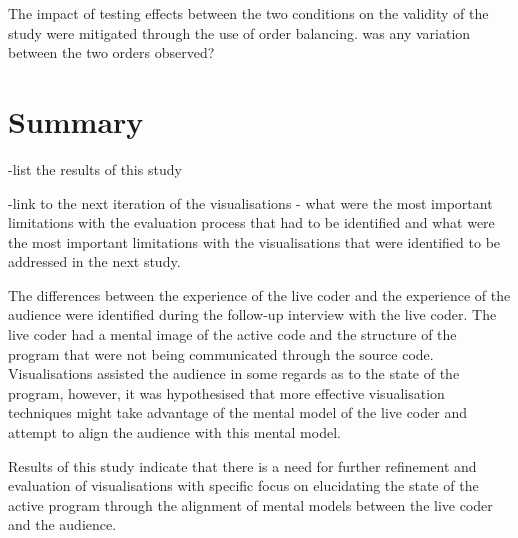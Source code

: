 The impact of testing effects between the two conditions on the validity of the study were mitigated through the use of order balancing. {\color{red} was any variation between the two orders observed?}

\section{Summary}

-list the results of this study

-link to the next iteration of the visualisations - what were the most important limitations with the evaluation process that had to be identified and what were the most important limitations with the visualisations that were identified to be addressed in the next study.

The differences between the experience of the live coder and the experience of the audience were identified during the follow-up interview with the live coder. The live coder had a mental image of the active code and the structure of the program that were not being communicated through the source code. Visualisations assisted the audience in some regards as to the state of the program, however, it was hypothesised that more effective visualisation techniques might take advantage of the mental model of the live coder and attempt to align the audience with this mental model.

Results of this study indicate that there is a need for further refinement and evaluation of visualisations with specific focus on elucidating the state of the active program through the alignment of mental models between the live coder and the audience.




